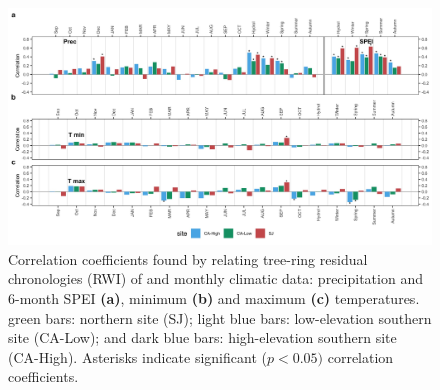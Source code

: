 \newpage
\begin{figure}
\centering
\includegraphics[width=\textwidth]{img/dendro/dendro-s6corclimate.jpg} 
\caption{Correlation coefficients found by relating tree-ring residual chronologies (RWI) of \Qp and monthly climatic data: precipitation and 6-month SPEI \textbf{(a)}, minimum \textbf{(b)} and maximum \textbf{(c)} temperatures. green bars: northern site (SJ); light blue bars: low-elevation southern site (CA-Low); and dark blue bars: high-elevation southern site (CA-High). Asterisks indicate significant (\(p<0.05)\) correlation coefficients.}  
\label{fig:dendro:s6corclimate}
\end{figure}
